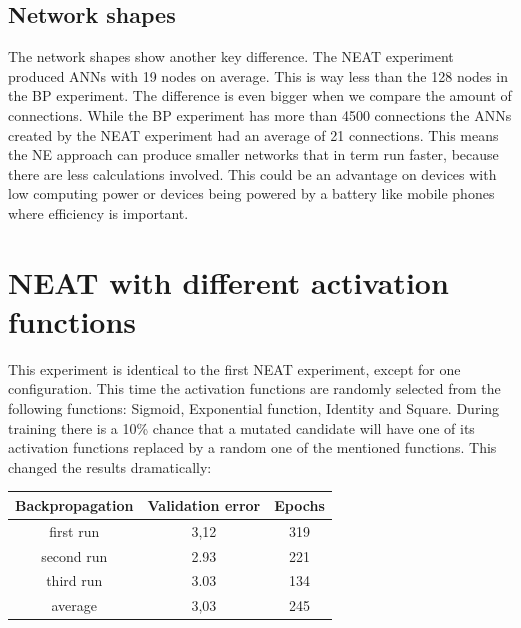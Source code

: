 \documentclass{llncs}
\begin{document}
\subsection{Network shapes}
%
The network shapes show another key difference. The NEAT experiment produced ANNs with 19 nodes on average. This is way less than the 128 nodes in the BP experiment. The difference is even bigger when we compare the amount of connections. While the BP experiment has more than 4500 connections the ANNs created by the NEAT experiment had an average of 21 connections. This means the NE approach can produce smaller networks that in term run faster, because there are less calculations involved. This could be an advantage on devices with low computing power or devices being powered by a battery like mobile phones where efficiency is important.
%
\section{NEAT with different activation functions}
%
This experiment is identical to the first NEAT experiment, except for one configuration. This time the activation functions are randomly selected from the following functions: Sigmoid, Exponential function, Identity and Square. During training there is a 10\% chance that a mutated candidate will have one of its activation functions replaced by a random one of the mentioned functions. This changed the results dramatically:
%
\begin{center}
	\begin{tabular}{ | c | c| c | } 
		\hline
		Backpropagation & Validation error & Epochs \\ 
		\hline
		first run & 3,12 & 319 \\ 
		\hline
		second run & 2.93 & 221  \\ 
		\hline
		third run & 3.03 & 134  \\ 
		\hline
		average & 3,03 & 245 \\ 
		\hline
	\end{tabular}
\end{center}
%
\end{document}
